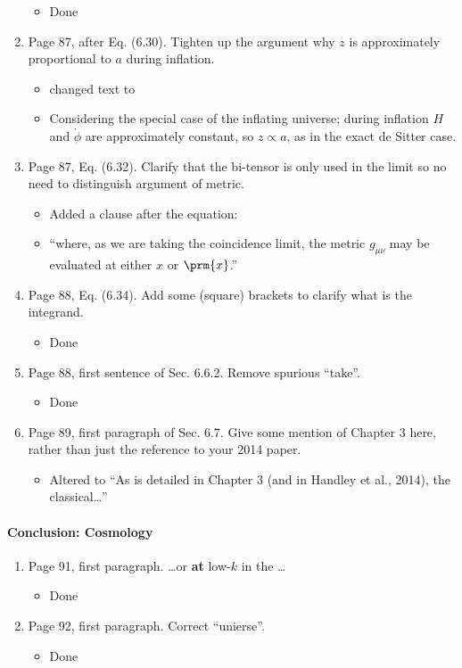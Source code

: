 \documentclass[11pt]{article}
\begin{document}
\begin{enumerate}
    \begin{itemize}
        \item Done
    \end{itemize}
\item Page 87, after Eq. (6.30). Tighten up the argument why $z$ is
  approximately proportional to $a$ during inflation.
  \begin{itemize}
      \item changed text to
      \item Considering the special case of the inflating universe; during inflation \(H\) and \(\dot{\phi}\) are approximately constant, so \(z\propto a\), as in the exact de Sitter case.
  \end{itemize}
\item Page 87, Eq. (6.32). Clarify that the bi-tensor is only used in
  the limit so no need to distinguish argument of metric.
  \begin{itemize}
      \item Added a clause after the equation:
        \item ``where, as we are taking the coincidence limit, the metric \(g_{\mu\nu}\) may be evaluated at either \(x\) or \(\prm{x}\).''
  \end{itemize}
\item Page 88, Eq. (6.34). Add some (square) brackets to clarify what
  is the integrand.
  \begin{itemize}
      \item Done
  \end{itemize}
\item Page 88,  first sentence of Sec. 6.6.2. Remove spurious
  ``take''.
  \begin{itemize}
      \item Done
  \end{itemize}
\item Page 89, first paragraph of Sec. 6.7. Give some mention of
  Chapter 3 here, rather than just the reference to your 2014 paper. 
  \begin{itemize}
      \item Altered to ``As is detailed in Chapter 3 (and in Handley et al., 2014), the classical\ldots''
  \end{itemize}
\end{enumerate}

\paragraph{Conclusion: Cosmology}
\begin{enumerate}
\item Page 91, first paragraph. \ldots or \textbf{at} low-$k$ in the
  \ldots
  \begin{itemize}
      \item Done
  \end{itemize}
\item Page 92, first paragraph. Correct ``unierse''.
    \begin{itemize}
        \item Done
    \end{itemize}
\end{enumerate}
\end{document}
